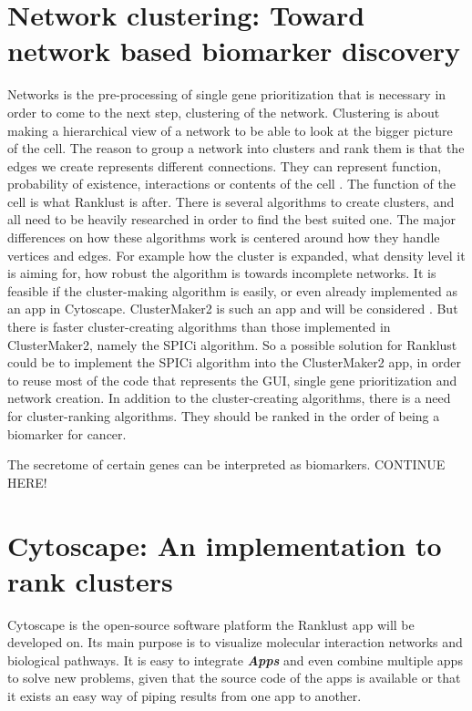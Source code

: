 \chapter{Network clustering: Toward network based biomarker discovery}
Networks is the pre-processing of single gene prioritization that is necessary
in order to come to the next step, clustering of the network. Clustering is
about making a hierarchical view of a network to be able to look at the bigger
picture of the cell. The reason to group a network into clusters and rank them
is that the edges we create represents different connections. They can represent
function, probability of existence, interactions or contents of the cell
\cite{siri}. The function of the cell is what Ranklust is after. There is
several algorithms to create clusters, and all need to be heavily researched in
order to find the best suited one. The major differences on how these algorithms
work is centered around how they handle vertices and edges. For example how the
cluster is expanded, what density level it is aiming for, how robust the
algorithm is towards incomplete networks. It is feasible if the cluster-making
algorithm is easily, or even already implemented as an app in Cytoscape.
ClusterMaker2 is such an app and will be considered \cite{cm2}. But there is
faster cluster-creating algorithms than those implemented in ClusterMaker2,
namely the SPICi \cite{spici} algorithm. So a possible solution for Ranklust
could be to implement the SPICi algorithm into the ClusterMaker2 app, in order
to reuse most of the code that represents the GUI, single gene prioritization
and network creation. In addition to the cluster-creating algorithms, there is a
need for cluster-ranking algorithms. They should be ranked in the order of being
a biomarker for cancer.


The secretome of certain genes can be interpreted as biomarkers.
CONTINUE HERE!

\chapter{Cytoscape: An implementation to rank clusters}
Cytoscape is the open-source software platform the Ranklust app will be
developed on. Its main purpose is to visualize molecular interaction networks
and biological pathways.  It is easy to integrate \textbf{\textit{Apps}} and
even combine multiple apps to solve new problems, given that the source code of
the apps is available or that it exists an easy way of piping results from one
app to another. 

